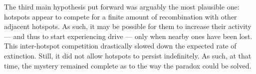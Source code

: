 The third main hypothesis put forward was arguably the most plausible one: hotspots appear to compete for a finite amount of recombination with other adjacent hotspots.
As such, it may be possible for them to increase their activity — and thus to start experiencing drive — only when nearby ones have been lost.
This inter-hotspot competition drastically slowed down the expected rate of extinction. Still, it did not allow hotspots to persist indefinitely.
As such, at that time, the mystery remained complete as to the way the paradox could be solved. 





%
%

%
%
%
%




